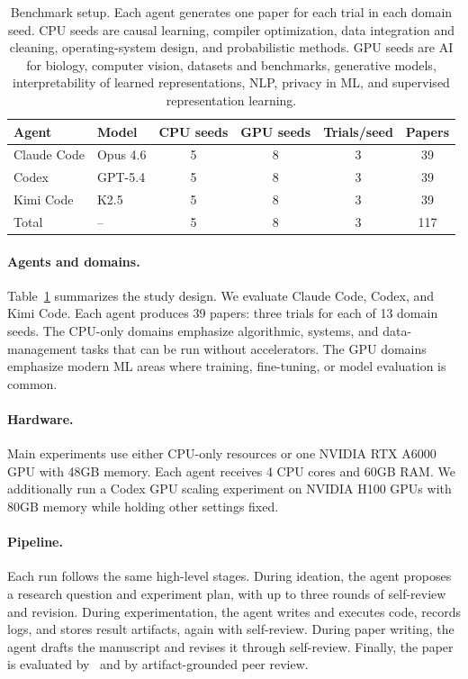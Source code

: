 \begin{table}[t]
\centering
\small
\begin{tabularx}{\linewidth}{l l c c c c}
\toprule
Agent & Model & CPU seeds & GPU seeds & Trials/seed & Papers \\
\midrule
Claude Code & Opus 4.6 & 5 & 8 & 3 & 39 \\
Codex & GPT-5.4 & 5 & 8 & 3 & 39 \\
Kimi Code & K2.5 & 5 & 8 & 3 & 39 \\
\midrule
Total & -- & 5 & 8 & 3 & 117 \\
\bottomrule
\end{tabularx}
\caption{Benchmark setup. Each agent generates one paper for each trial in each domain seed. CPU seeds are causal learning, compiler optimization, data integration and cleaning, operating-system design, and probabilistic methods. GPU seeds are AI for biology, computer vision, datasets and benchmarks, generative models, interpretability of learned representations, NLP, privacy in ML, and supervised representation learning.}
\label{tab:setup}
\end{table}

\paragraph{Agents and domains.}
Table~\ref{tab:setup} summarizes the study design. We evaluate Claude Code, Codex, and Kimi Code. Each agent produces 39 papers: three trials for each of 13 domain seeds. The CPU-only domains emphasize algorithmic, systems, and data-management tasks that can be run without accelerators. The GPU domains emphasize modern ML areas where training, fine-tuning, or model evaluation is common.

\paragraph{Hardware.}
Main experiments use either CPU-only resources or one NVIDIA RTX A6000 GPU with 48GB memory. Each agent receives 4 CPU cores and 60GB RAM. We additionally run a Codex GPU scaling experiment on NVIDIA H100 GPUs with 80GB memory while holding other settings fixed.

\paragraph{Pipeline.}
Each run follows the same high-level stages. During ideation, the agent proposes a research question and experiment plan, with up to three rounds of self-review and revision. During experimentation, the agent writes and executes code, records logs, and stores result artifacts, again with self-review. During paper writing, the agent drafts the manuscript and revises it through self-review. Finally, the paper is evaluated by \sar\ and by artifact-grounded peer review.

